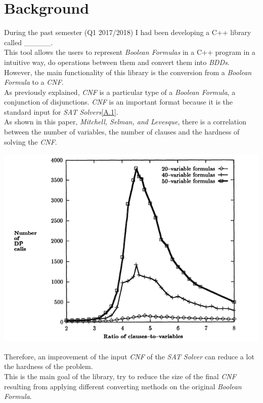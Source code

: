 \section{Background}

During the past semester (Q1 2017/2018) I had been developing a C++ library called \_\_\_\_\_.\\
This tool allows the users to represent \emph{Boolean Formulas} in a C++ program in a intuitive way, do operations between them and convert them into \emph{BDDs}. However, the main functionality of this library is the conversion from a \emph{Boolean Formula} to a \emph{CNF}.  \\
As previously explained, \emph{CNF} is a particular type of a \emph{Boolean Formula}, a conjunction of disjunctions. \emph{CNF} is an important format because it is the standard input for \emph{SAT Solvers}\ref{A.1}.\\
As shown in this paper, \emph{Mitchell, Selman, and Levesque\cite{Mitchell}}, there is a correlation between the number of variables, the number of clauses and the hardness of solving the \emph{CNF}.
\begin{center}
	\includegraphics[width=1\textwidth]{Figures/GraphMitchellSelmanLevesque.png}
\end{center}
Therefore, an improvement of the input \emph{CNF} of the \emph{SAT Solver} can reduce a lot the hardness of the problem. \\
This is the main goal of the library, try to reduce the size of the final \emph{CNF} resulting from applying different converting methods on the original \emph{Boolean Formula}.

